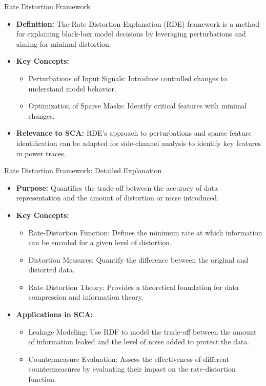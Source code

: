 \documentclass{beamer}
\begin{document}
\begin{frame}{Rate Distortion Framework}
    \begin{itemize}
        \item \textbf{Definition:} The Rate Distortion Explanation (RDE) framework is a method for explaining black-box model decisions by leveraging perturbations and aiming for minimal distortion.
        \item \textbf{Key Concepts:}
        \begin{itemize}
            \item Perturbations of Input Signals: Introduce controlled changes to understand model behavior.
            \item Optimization of Sparse Masks: Identify critical features with minimal changes.
        \end{itemize}
        \item \textbf{Relevance to SCA:} RDE's approach to perturbations and sparse feature identification can be adapted for side-channel analysis to identify key features in power traces.
    \end{itemize}
\end{frame}

\begin{frame}{Rate Distortion Framework: Detailed Explanation}
    \begin{itemize}
        \item \textbf{Purpose:} Quantifies the trade-off between the accuracy of data representation and the amount of distortion or noise introduced.
        \item \textbf{Key Concepts:} 
        \begin{itemize}
            \item Rate-Distortion Function: Defines the minimum rate at which information can be encoded for a given level of distortion.
            \item Distortion Measures: Quantify the difference between the original and distorted data.
            \item Rate-Distortion Theory: Provides a theoretical foundation for data compression and information theory.
        \end{itemize}
        \item \textbf{Applications in SCA:}
        \begin{itemize}
            \item Leakage Modeling: Use RDF to model the trade-off between the amount of information leaked and the level of noise added to protect the data.
            \item Countermeasure Evaluation: Assess the effectiveness of different countermeasures by evaluating their impact on the rate-distortion function.
        \end{itemize}
    \end{itemize}
\end{frame}
\end{document}
